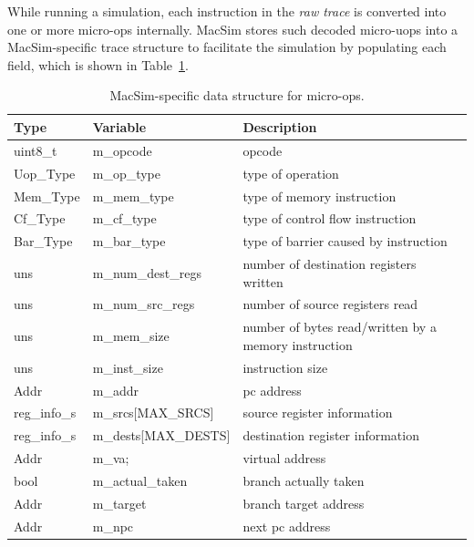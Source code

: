 While running a simulation, each instruction in the \emph{raw trace} is converted 
into one or more micro-ops internally. MacSim stores such decoded micro-uops into a MacSim-specific
trace structure to facilitate the simulation by populating each field, which is shown 
in Table~\ref{table:trace_uops}.

\begin{table}[htb]
\begin{footnotesize}
\begin{center}
\caption{MacSim-specific data structure for micro-ops.}
\label{table:trace_uops}
\begin{tabular}{|l|l|l|} 
\hline
Type      & Variable                 & Description \\ \hline \hline
uint8\_t  & m\_opcode                & opcode \\ \hline
Uop\_Type & m\_op\_type              & type of operation \\ \hline
Mem\_Type & m\_mem\_type             & type of memory instruction \\ \hline
Cf\_Type  & m\_cf\_type              & type of control flow instruction \\ \hline
Bar\_Type & m\_bar\_type             & type of barrier caused by instruction \\ \hline
uns       &   m\_num\_dest\_regs     & number of destination registers written \\ \hline
uns       &   m\_num\_src\_regs      & number of source registers read \\ \hline
uns       &   m\_mem\_size           & number of bytes read/written by a memory instruction \\ \hline
uns       &   m\_inst\_size          & instruction size \\ \hline
Addr      &   m\_addr                & pc address  \\ \hline
reg\_info\_s&   m\_srcs[MAX\_SRCS]   & source register information \\ \hline
reg\_info\_s&   m\_dests[MAX\_DESTS] & destination register information \\ \hline
Addr      &   m\_va;                 & virtual address \\ \hline
bool      &   m\_actual\_taken       & branch actually taken \\ \hline
Addr      &   m\_target              & branch target address \\ \hline
Addr      &   m\_npc                 & next pc address  \\ \hline

\end{tabular}
\end{center}
\end{footnotesize}
\end{table}

